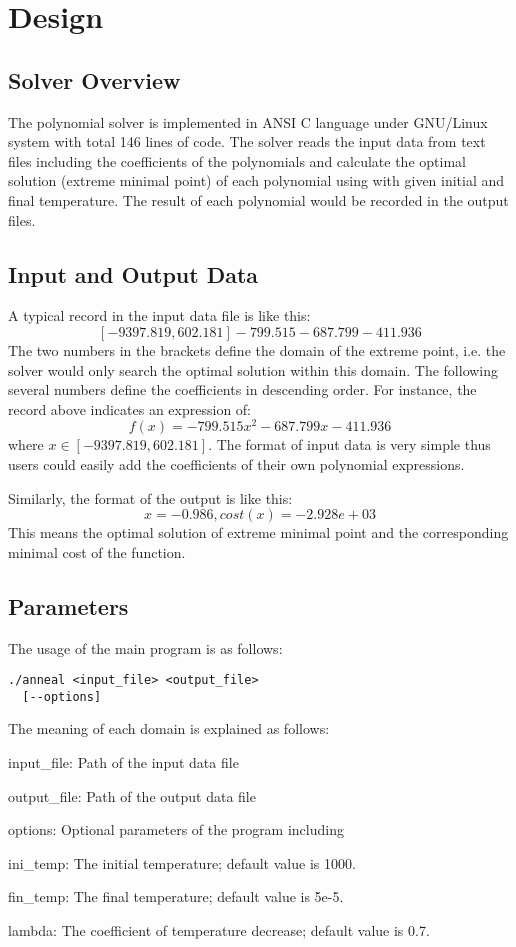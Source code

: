 \section{Design}
\label{sec:design}
\subsection{Solver Overview}
The \SA polynomial solver is implemented in ANSI C language under GNU/Linux system with total 146 lines of code. The solver reads the input data from text files including the coefficients of the polynomials and calculate the optimal solution (extreme minimal point) of each polynomial using \SA with given initial and final temperature. The result of each polynomial would be recorded in the output files.
\subsection{Input and Output Data}
A typical record in the input data file is like this:
$$[-9397.819, 602.181] -799.515 -687.799 -411.936$$
The two numbers in the brackets define the domain of the extreme point, i.e. the solver would only search the optimal solution within this domain. The following several numbers define the coefficients in descending order. For instance, the record above indicates an expression of:
$$f(x) = -799.515x^2-687.799x-411.936$$
where $x\in[-9397.819, 602.181]$. The format of input data is very simple thus users could easily add the coefficients of their own polynomial expressions.

Similarly, the format of the output is like this:
$$x = -0.986, cost(x) = -2.928e+03$$
This means the optimal solution of extreme minimal point and the corresponding minimal cost of the function.
\subsection{Parameters}
The usage of the main program is as follows:
\begin{verbatim}
./anneal <input_file> <output_file>
  [--options]
\end{verbatim}
The meaning of each domain is explained as follows:
\begin{compactitem}
\item input\_file: Path of the input data file
\item output\_file: Path of the output data file
\item options: Optional parameters of the program including
    \begin{compactitem}
    \item ini\_temp: The initial temperature; default value is 1000.
    \item fin\_temp: The final temperature; default value is 5e-5.
    \item lambda: The coefficient of temperature decrease; default value is 0.7.
    \end{compactitem}
\end{compactitem}
